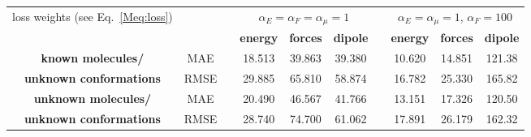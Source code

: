 \documentclass[%
superscriptaddress,
reprint,
nofootinbib,
amsmath,amssymb,amsfonts,
floatfix,
altaffilletter,
showkeys,
]{revtex4-2}
\newcommand{\nn}{SpookyNet}
\begin{document}
\begin{table*}
	\begin{tabular}{c c c c c c c c c c}
		\toprule
		loss weights (see Eq.~\ref{Meq:loss}) & \qquad\qquad\qquad & \quad & \multicolumn{3}{c}{$\alpha_E = \alpha_F = \alpha_\mu = 1$} & \quad\quad & \multicolumn{3}{c}{$\alpha_E = \alpha_\mu = 1$, $\alpha_F = 100$} \\
		& & &
		\textbf{energy} & \textbf{forces} &
		\textbf{dipole} & & \textbf{energy} & \textbf{forces} &
		\textbf{dipole}\\
		\midrule
		\textbf{known molecules/} & MAE & & 18.513 & 39.863 & 39.380 &  & 10.620 & 14.851& 121.38 \\
		\textbf{unknown conformations} & RMSE & & 29.885 & 65.810  & 58.874 & & 16.782 & 25.330 & 165.82\\
		\midrule
		\textbf{unknown molecules/} & MAE & & 20.490 & 46.567 & 41.766 & & 13.151 & 17.326 & 120.50\\
		\textbf{unknown conformations} & RMSE & & 28.740 & 74.700 & 61.062 & & 17.891 & 26.179 & 162.32 \\
		\bottomrule
	\end{tabular}
	\caption{Mean absolute errors (MAEs) and root mean square errors (RMSEs) of energies (meV), forces
		(meV~\AA$^{-1}$) and dipole moments (mD) for the QM7-X\cite{hoja2021qm7} dataset. Here, \nn{} is trained with either a low or high force weight $\alpha_F$ in the loss function (see Eq.~\ref{Meq:loss}).}
	\label{tab:qm7x_results_low_force_weight}
\end{table*}
	
	
\end{document}
